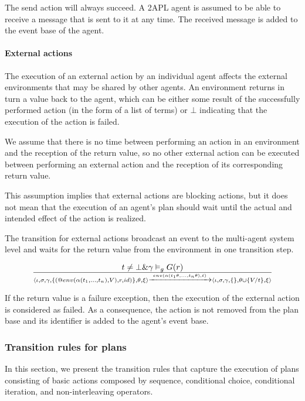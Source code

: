 \documentclass[a4paper]{article}
\begin{document}
The send action will always succeed. A 2APL agent is assumed to be able to receive a message that is sent to it at any time. The received message is added to the event base of the agent.

\paragraph{External actions}

The execution of an external action by an individual agent affects the external environments that may be shared by other agents. An environment returns in turn a value back to the agent, which can be either some result of the successfully performed action (in the form of a list of terms) or $\bot$ indicating that the execution of the action is failed.

We assume that there is no time between performing an action in an environment and the reception of the return value, so no other external action can be executed between performing an external action and the reception of its corresponding return value.

This assumption implies that external actions are blocking actions, but it does not mean that the execution of an agent's plan should wait until the actual and intended effect of the action is realized.

The transition for external actions broadcast an event to the multi-agent system level and waits for the return value from the environment in one transition step.

$$ {t \neq \bot \& \gamma \vDash_{g} G(r)} \over {\langle \iota, \sigma, \gamma, \{(@env(\alpha(t_{1}, \ldots, t_{n}), V), r, id)\},\theta, \xi \rangle \xrightarrow{env(\alpha(t_{1}\theta, \ldots, t_{n}\theta), t)} \langle \iota, \sigma, \gamma, \{\}, \theta \cup \{ V/t\}, \xi \rangle } $$

If the return value is a failure exception, then the execution of the external action is considered as failed. As a consequence, the action is not removed from the plan base and its identifier is added to the agent's event base.

\subsubsection{Transition rules for plans}

In this section, we present the transition rules that capture the execution of plans consisting of basic actions composed by sequence, conditional choice, conditional iteration, and non-interleaving operators.
\end{document}
